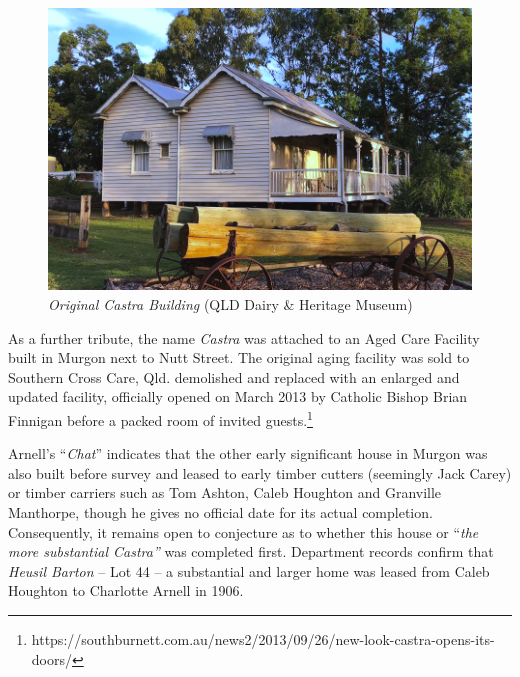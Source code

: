 \begin{figure}[!htb]
\begin{center}
\includegraphics[width=1.\textwidth,center]{../images/castraOld.jpg}
\caption{{\itshape Original Castra Building} {\scriptsize(QLD Dairy \& Heritage Museum)}}
\end{center}
\end{figure}




As a further tribute, the name \emph{Castra} was attached to an Aged Care Facility built in Murgon next to Nutt Street. The original aging facility was sold to Southern Cross Care, Qld. demolished and replaced with an enlarged and updated facility, officially opened on March 2013 by Catholic Bishop Brian Finnigan before a packed room of invited guests.\footnote{https://southburnett.com.au/news2/2013/09/26/new-look-castra-opens-its-doors/}


Arnell's ``\emph{Chat}'' indicates that the other early significant house in Murgon was also built before survey and leased to early timber cutters (seemingly Jack Carey) or timber carriers such as Tom Ashton, Caleb Houghton and Granville Manthorpe, though he gives no official date for its actual completion. Consequently, it remains open to conjecture as to whether this house or ``\emph{the more substantial Castra''} was completed first. Department records confirm that \emph{Heusil Barton} -- Lot 44 -- a substantial and larger home was leased from Caleb Houghton to Charlotte Arnell in 1906.



